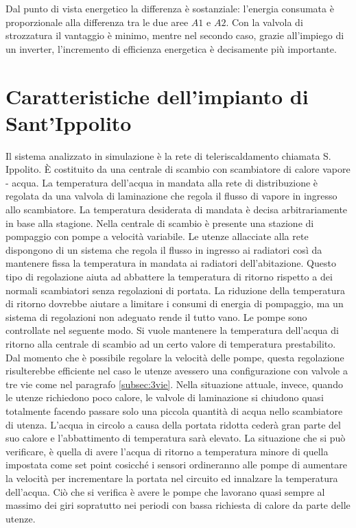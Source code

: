 \documentclass[laurea,oneside,11pt]{USiena_tesiLM3}
\begin{document}
Dal punto di vista energetico la differenza è sostanziale: l'energia consumata è proporzionale alla differenza tra le due aree $A1$ e $A2$. Con la valvola di strozzatura il vantaggio è minimo, mentre nel secondo caso, grazie all'impiego di un inverter, l'incremento di efficienza energetica è decisamente più importante.


\section{Caratteristiche dell'impianto di Sant'Ippolito}
Il sistema analizzato in simulazione è la rete di teleriscaldamento chiamata S. Ippolito. \`E costituito da una centrale di scambio con scambiatore di calore vapore - acqua. La temperatura dell'acqua in mandata alla rete di distribuzione è regolata da una valvola di laminazione che regola il flusso di vapore in ingresso allo scambiatore. La temperatura desiderata di mandata è decisa arbitrariamente in base alla stagione. Nella centrale di scambio è presente una stazione di pompaggio con pompe a velocità variabile.
Le utenze allacciate alla rete dispongono di un sistema che regola il flusso in ingresso ai radiatori così da mantenere fissa la temperatura in mandata ai radiatori dell'abitazione. Questo tipo di regolazione aiuta ad abbattere la temperatura di ritorno rispetto a dei normali  scambiatori senza regolazioni di portata. La riduzione della temperatura di ritorno dovrebbe aiutare a limitare i consumi di energia di pompaggio, ma un sistema di regolazioni non adeguato rende il tutto vano. Le pompe sono controllate nel seguente modo. Si vuole mantenere la temperatura dell'acqua di ritorno alla centrale di scambio ad un certo valore di temperatura prestabilito. Dal momento che è possibile regolare la velocità delle pompe, questa regolazione   risulterebbe efficiente nel caso le utenze avessero una configurazione con valvole a tre vie come nel paragrafo \ref{subsec:3vie}. Nella situazione attuale, invece, quando le utenze richiedono poco calore, le valvole di laminazione si chiudono quasi totalmente facendo passare solo una piccola quantità di acqua nello scambiatore di utenza. L'acqua in circolo a causa della portata ridotta cederà gran parte del suo calore e l'abbattimento di temperatura sarà elevato. La situazione che si può verificare, è quella di avere l'acqua di ritorno a temperatura minore di quella impostata come set point cosicché i sensori ordineranno alle pompe di aumentare la velocità per incrementare la portata  nel circuito ed innalzare la temperatura dell'acqua. Ciò che si verifica è avere le pompe che lavorano quasi sempre al massimo dei giri sopratutto nei periodi con bassa richiesta di calore da parte delle utenze.
\end{document}
